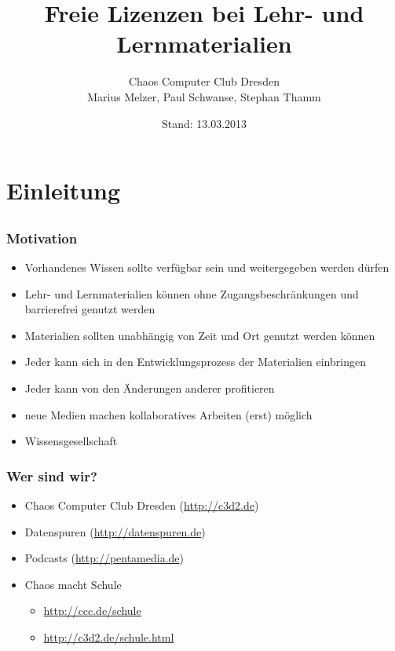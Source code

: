 \documentclass{beamer}
\title{Freie Lizenzen bei Lehr- und Lernmaterialien}
\author{Chaos Computer Club Dresden\\Marius Melzer, Paul Schwanse, Stephan Thamm}
\date{Stand: 13.03.2013}
\begin{document}
\maketitle

\frame{\tableofcontents[hideallsubsections]}

\section{Einleitung}
\subsection{}

\begin{frame}
    \frametitle{Motivation}
    \begin{itemize}
        \item<2-> Vorhandenes Wissen sollte verfügbar sein und weitergegeben werden dürfen
        \item<3-> Lehr- und Lernmaterialien können ohne Zugangsbeschränkungen und barrierefrei genutzt werden
        \item<4-> Materialien sollten unabhängig von Zeit und Ort genutzt werden können
        \item<5-> Jeder kann sich in den Entwicklungsprozess der Materialien einbringen
        \item<6-> Jeder kann von den Änderungen anderer profitieren
        \item<7-> neue Medien machen kollaboratives Arbeiten (erst) möglich
        \item<8-> Wissensgesellschaft
    \end{itemize}
\end{frame}
 
\begin{frame}
    \frametitle{Wer sind wir?}
    \begin{itemize}
        \item<2-> Chaos Computer Club Dresden (\url{http://c3d2.de})
            \note{}
        \item<3-> Datenspuren (\url{http://datenspuren.de})
        \item<4-> Podcasts (\url{http://pentamedia.de})
        \item<5-> Chaos macht Schule
            \begin{itemize}
                \item<2-> \url{http://ccc.de/schule}
                \item<2-> \url{http://c3d2.de/schule.html}
            \end{itemize}
    \end{itemize}
\end{frame}
\end{document}

